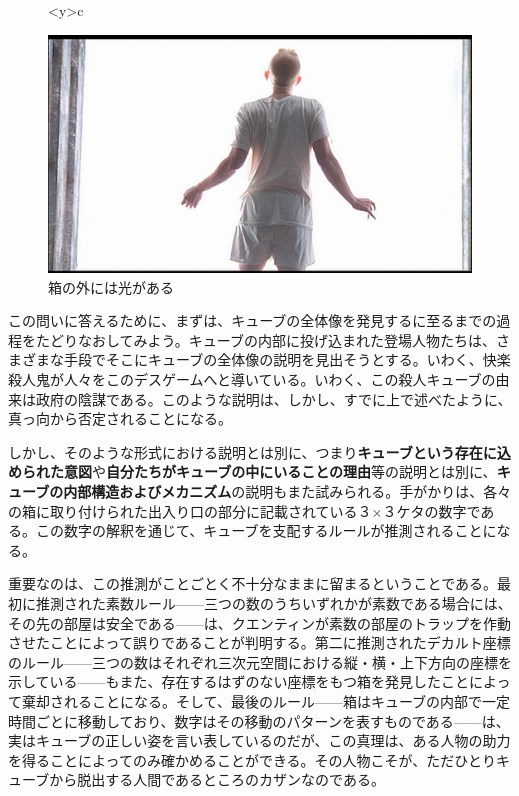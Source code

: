 \documentclass[9pt,b5j,twoside,twocolumn]{utarticle}
\begin{document}
\begin{figure}[h]
\begin{tabular}<y>{c}
\begin{minipage}[c]{0.65\hsize}
\centering
\includegraphics[scale=0.1]{光}
\caption{箱の外には光がある}
\end{minipage}
\end{tabular}
\end{figure}

この問いに答えるために、まずは、キューブの全体像を発見するに至るまでの過程をたどりなおしてみよう。キューブの内部に投げ込まれた登場人物たちは、さまざまな手段でそこにキューブの全体像の説明を見出そうとする。いわく、快楽殺人鬼が人々をこのデスゲームへと導いている。いわく、この殺人キューブの由来は政府の陰謀である。このような説明は、しかし、すでに上で述べたように、真っ向から否定されることになる。

しかし、そのような形式における説明とは別に、つまり\textbf{キューブという存在に込められた意図}や\textbf{自分たちがキューブの中にいることの理由}等の説明とは別に、\textbf{キューブの内部構造およびメカニズム}の説明もまた試みられる。手がかりは、各々の箱に取り付けられた出入り口の部分に記載されている３×３ケタの数字である。この数字の解釈を通じて、キューブを支配するルールが推測されることになる。

重要なのは、この推測がことごとく不十分なままに留まるということである。最初に推測された素数ルール------三つの数のうちいずれかが素数である場合には、その先の部屋は安全である------は、クエンティンが素数の部屋のトラップを作動させたことによって誤りであることが判明する。第二に推測されたデカルト座標のルール------三つの数はそれぞれ三次元空間における縦・横・上下方向の座標を示している------もまた、存在するはずのない座標をもつ箱を発見したことによって棄却されることになる。そして、最後のルール------箱はキューブの内部で一定時間ごとに移動しており、数字はその移動のパターンを表すものである------は、実はキューブの正しい姿を言い表しているのだが、この真理は、ある人物の助力を得ることによってのみ確かめることができる。その人物こそが、ただひとりキューブから脱出する人間であるところのカザンなのである。
\end{document}
